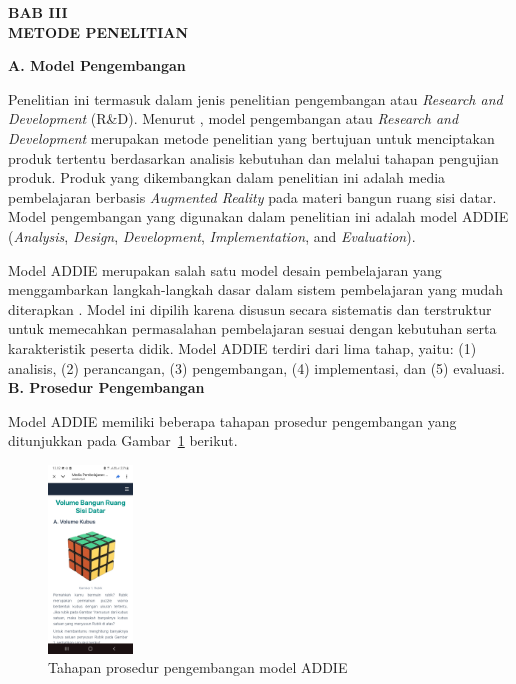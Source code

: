 \documentclass[12pt]{article}
\begin{document}
\newpage
\begin{center}
    \textbf{BAB III}\\
    \textbf{METODE PENELITIAN}
\end{center}

\textbf{A. Model Pengembangan}

\hspace*{1cm}Penelitian ini termasuk dalam jenis penelitian pengembangan atau \textit{Research and Development} (R\&D). Menurut \citet{sugiyono2015}, model pengembangan atau \textit{Research and Development} merupakan metode penelitian yang bertujuan untuk menciptakan produk tertentu berdasarkan analisis kebutuhan dan melalui tahapan pengujian produk. Produk yang dikembangkan dalam penelitian ini adalah media pembelajaran berbasis \textit{Augmented Reality} pada materi bangun ruang sisi datar. Model pengembangan yang digunakan dalam penelitian ini adalah model ADDIE (\textit{Analysis}, \textit{Design}, \textit{Development}, \textit{Implementation}, and \textit{Evaluation}).

\hspace*{1cm}Model ADDIE merupakan salah satu model desain pembelajaran yang menggambarkan langkah-langkah dasar dalam sistem pembelajaran yang mudah diterapkan \citep{cahyadi2019}. Model ini dipilih karena disusun secara sistematis dan terstruktur untuk memecahkan permasalahan pembelajaran sesuai dengan kebutuhan serta karakteristik peserta didik. Model ADDIE terdiri dari lima tahap, yaitu: (1) analisis, (2) perancangan, (3) pengembangan, (4) implementasi, dan (5) evaluasi.\\


\textbf{B. Prosedur Pengembangan}

\hspace*{1cm}Model ADDIE memiliki beberapa tahapan prosedur pengembangan yang ditunjukkan pada Gambar~\ref{gambar-addie} berikut.
\begin{figure}[H]
  \centering
  \includegraphics[width=0.2\textwidth]{images/materi1.jpg}
  \caption{Tahapan prosedur pengembangan model ADDIE}
  \label{gambar-addie}
\end{figure}
\end{document}
